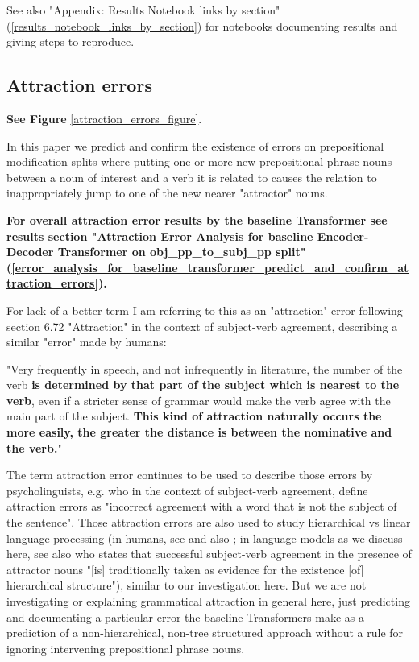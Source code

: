 \documentclass[11pt]{article}
\begin{document}
See also "Appendix: Results Notebook links by section" (\ref{results_notebook_links_by_section}) for notebooks documenting results and giving steps to reproduce.
\subsection{Attraction errors}
\label{attraction_errors}

\textbf{See Figure} \ref{attraction_errors_figure}.

In this paper we predict and confirm the existence of errors on prepositional modification splits where putting one or more new prepositional phrase nouns between a noun of interest and a verb it is related to causes the relation to inappropriately jump to one of the new nearer "attractor" nouns. 

\textbf{For overall attraction error results by the baseline Transformer see results section "Attraction Error Analysis for \cite{Wu2023} baseline Encoder-Decoder Transformer on obj\_pp\_to\_subj\_pp split" (\ref{error_analysis_for_baseline_transformer_predict_and_confirm_attraction_errors}).}

For lack of a better term I am referring to this as an "attraction" error following \cite{jespersen1913modernenglishgrammar1954reprint} section 6.72 "Attraction" in the context of subject-verb agreement, describing a similar "error" made by humans:

"Very frequently in speech, and not infrequently in
literature, the number of the verb \textbf{is determined by
that part of the subject which is nearest to the verb},
even if a stricter sense of grammar would make
the verb agree with the main part of the subject.
\textbf{This kind of attraction naturally occurs the more easily, the greater the distance is between the nominative and the verb.}"

The term attraction error continues to be used to describe those errors by psycholinguists, e.g. \cite{FRANCK2006173} who in the context of subject-verb agreement, define attraction errors as "incorrect agreement with a word that is not the subject of the sentence".
Those attraction errors are also used to study hierarchical vs linear language processing (in humans, see \cite{FRANCK2006173} and also \cite{VIGLIOCCO1998B13}; in language models as we discuss here, see also \cite{goldberg2019assessingbertssyntacticabilities} who states that successful subject-verb agreement in the presence of attractor nouns  "[is] traditionally taken as evidence for the existence [of] hierarchical structure"), similar to our investigation here. But we are not investigating or explaining grammatical attraction in general here, just predicting and documenting a particular error the baseline Transformers make as a prediction of a non-hierarchical, non-tree structured approach without a rule for ignoring intervening prepositional phrase nouns.
\end{document}
